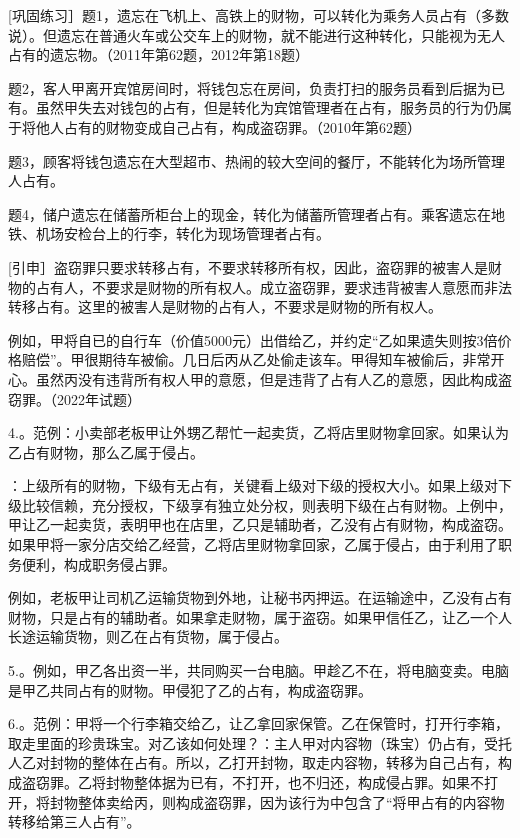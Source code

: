 [巩固练习］题1，遗忘在飞机上、高铁上的财物，可以转化为乘务人员占有（多数说）。但遗忘在普通火车或公交车上的财物，就不能进行这种转化，只能视为无人占有的遗忘物。（2011年第62题，2012年第18题）

题2，客人甲离开宾馆房间时，将钱包忘在房间，负责打扫的服务员看到后据为已有。虽然甲失去对钱包的占有，但是转化为宾馆管理者在占有，服务员的行为仍属于将他人占有的财物变成自己占有，构成盗窃罪。（2010年第62题）

题3，顾客将钱包遗忘在大型超市、热闹的较大空间的餐厅，不能转化为场所管理人占有。

题4，储户遗忘在储蓄所柜台上的现金，转化为储蓄所管理者占有。乘客遗忘在地铁、机场安检台上的行李，转化为现场管理者占有。

[引申］盗窃罪只要求转移占有，不要求转移所有权，因此，盗窃罪的被害人是财物的占有人，不要求是财物的所有权人。成立盗窃罪，要求违背被害人意愿而非法转移占有。这里的被害人是财物的占有人，不要求是财物的所有权人。

例如，甲将自已的自行车（价值5000元）出借给乙，并约定“乙如果遗失则按3倍价格赔偿”。甲很期待车被偷。几日后丙从乙处偷走该车。甲得知车被偷后，非常开心。虽然丙没有违背所有权人甲的意愿，但是违背了占有人乙的意愿，因此构成盗窃罪。（2022年试题）

4.。范例：小卖部老板甲让外甥乙帮忙一起卖货，乙将店里财物拿回家。如果认为乙占有财物，那么乙属于侵占。

：上级所有的财物，下级有无占有，关键看上级对下级的授权大小。如果上级对下级比较信赖，充分授权，下级享有独立处分权，则表明下级在占有财物。上例中，甲让乙一起卖货，表明甲也在店里，乙只是辅助者，乙没有占有财物，构成盗窃。如果甲将一家分店交给乙经营，乙将店里财物拿回家，乙属于侵占，由于利用了职务便利，构成职务侵占罪。

例如，老板甲让司机乙运输货物到外地，让秘书丙押运。在运输途中，乙没有占有财物，只是占有的辅助者。如果拿走财物，属于盗窃。如果甲信任乙，让乙一个人长途运输货物，则乙在占有货物，属于侵占。

5.。例如，甲乙各出资一半，共同购买一台电脑。甲趁乙不在，将电脑变卖。电脑是甲乙共同占有的财物。甲侵犯了乙的占有，构成盗窃罪。

6.。范例：甲将一个行李箱交给乙，让乙拿回家保管。乙在保管时，打开行李箱，取走里面的珍贵珠宝。对乙该如何处理？：主人甲对内容物（珠宝）仍占有，受托人乙对封物的整体在占有。所以，乙打开封物，取走内容物，转移为自己占有，构成盗窃罪。乙将封物整体据为已有，不打开，也不归还，构成侵占罪。如果不打开，将封物整体卖给丙，则构成盗窃罪，因为该行为中包含了“将甲占有的内容物转移给第三人占有”。


